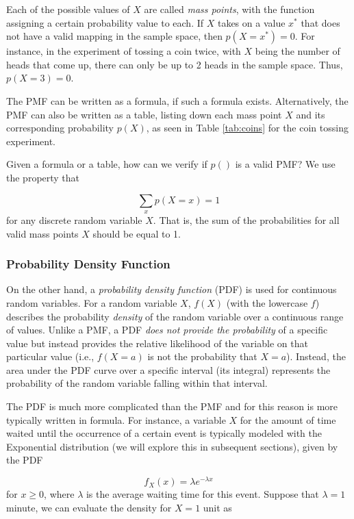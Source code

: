 \documentclass{article}
\begin{document}
Each of the possible values of $X$ are called \emph{mass points}, with the function assigning a certain probability value to each. If $X$ takes on a value $x^{*}$ that does not have a valid mapping in the sample space, then $p(X = x^{*}) = 0$. For instance, in the experiment of tossing a coin twice, with $X$ being the number of heads that come up, there can only be up to 2 heads in the sample space. Thus, $p(X = 3) = 0$.

The PMF can be written as a formula, if such a formula exists. Alternatively, the PMF can also be written as a table, listing down each mass point $X$ and its corresponding probability $p(X)$, as seen in Table \ref{tab:coins} for the coin tossing experiment.

Given a formula or a table, how can we verify if $p()$ is a valid PMF? We use the property that

$$
\sum_{x}{p(X = x)} = 1
$$
for any discrete random variable $X$. That is, the sum of the probabilities for all valid mass points $X$ should be equal to 1.

\subsubsection{Probability Density Function}

On the other hand, a \emph{probability density function} (PDF) is used for continuous random variables. For a random variable $X$, $f(X)$ (with the lowercase $f$) describes the probability \emph{density} of the random variable over a continuous range of values. Unlike a PMF, a PDF \emph{does not provide the probability} of a specific value but instead provides the relative likelihood of the variable on that particular value (i.e., $f(X = a)$ is not the probability that $X = a$). Instead, the area under the PDF curve over a specific interval (its integral) represents the probability of the random variable falling within that interval.

The PDF is much more complicated than the PMF and for this reason is more typically written in formula. For instance, a variable $X$ for the amount of time waited until the occurrence of a certain event is typically modeled with the Exponential distribution (we will explore this in subsequent sections), given by the PDF

$$
f_X(x) = \lambda e^{-\lambda x}
$$
for $x \geq 0$, where $\lambda$ is the average waiting time for this event. Suppose that $\lambda = 1$ minute, we can evaluate the density for $X = 1$ unit as
\end{document}
